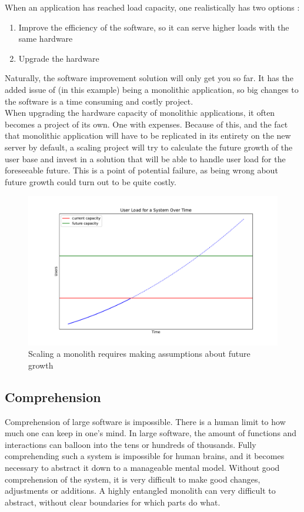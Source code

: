 When an application has reached load capacity, one realistically has two options \cite*{Scalability}:
\begin{enumerate}
    \item Improve the efficiency of the software, so it can serve higher loads with the same hardware
    \item Upgrade the hardware
\end{enumerate}
Naturally, the software improvement solution will only get you so far. It has the added issue of (in this example) being a monolithic application, so big changes to the software is a time consuming and costly project.\\
When upgrading the hardware capacity of monolithic applications, it often becomes a project of its own. One with expenses. 
Because of this, and the fact that monolithic application will have to be replicated in its entirety on the new server by default, a scaling project will try to calculate the future growth of the user base and invest in a solution that will be able to handle user load for the foreseeable future.
This is a point of potential failure, as being wrong about future growth could turn out to be quite costly.
\begin{figure}[ht] 
\centering 
\includegraphics[width=0.8\columnwidth]{Figures/Graphs/capacity_scaling.pdf}
\caption{Scaling a monolith requires making assumptions about future growth}
\label{Monolith scaling}
\end{figure}

\subsection{Comprehension}
Comprehension of large software is impossible. 
There is a human limit to how much one can keep in one's mind. 
In large software, the amount of functions and interactions can balloon into the tens or hundreds of thousands. 
Fully comprehending such a system is impossible for human brains, and it becomes necessary to abstract it down to a manageable mental model. 
Without good comprehension of the system, it is very difficult to make good changes, adjustments or additions.
A highly entangled monolith can very difficult to abstract, without clear boundaries for which parts do what.

